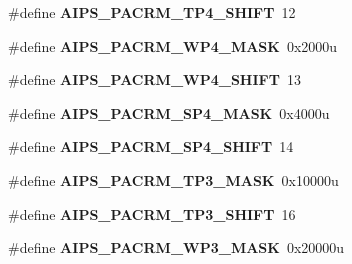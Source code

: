 \begin{DoxyCompactItemize}
\item 
\#define {\bfseries A\+I\+P\+S\+\_\+\+P\+A\+C\+R\+M\+\_\+\+T\+P4\+\_\+\+S\+H\+I\+FT}~12\hypertarget{group__AIPS__Register__Masks_ga5b654374c7c4e22ef97005746f343009}{}\label{group__AIPS__Register__Masks_ga5b654374c7c4e22ef97005746f343009}

\item 
\#define {\bfseries A\+I\+P\+S\+\_\+\+P\+A\+C\+R\+M\+\_\+\+W\+P4\+\_\+\+M\+A\+SK}~0x2000u\hypertarget{group__AIPS__Register__Masks_gacd70ba34033f811730f1ccb84daf0201}{}\label{group__AIPS__Register__Masks_gacd70ba34033f811730f1ccb84daf0201}

\item 
\#define {\bfseries A\+I\+P\+S\+\_\+\+P\+A\+C\+R\+M\+\_\+\+W\+P4\+\_\+\+S\+H\+I\+FT}~13\hypertarget{group__AIPS__Register__Masks_ga3a3e77be99e75550503f7c5b71f3f338}{}\label{group__AIPS__Register__Masks_ga3a3e77be99e75550503f7c5b71f3f338}

\item 
\#define {\bfseries A\+I\+P\+S\+\_\+\+P\+A\+C\+R\+M\+\_\+\+S\+P4\+\_\+\+M\+A\+SK}~0x4000u\hypertarget{group__AIPS__Register__Masks_ga14d029515875232b727e36844ecc8249}{}\label{group__AIPS__Register__Masks_ga14d029515875232b727e36844ecc8249}

\item 
\#define {\bfseries A\+I\+P\+S\+\_\+\+P\+A\+C\+R\+M\+\_\+\+S\+P4\+\_\+\+S\+H\+I\+FT}~14\hypertarget{group__AIPS__Register__Masks_ga9fc76b0cb29d106a835ef7905978be39}{}\label{group__AIPS__Register__Masks_ga9fc76b0cb29d106a835ef7905978be39}

\item 
\#define {\bfseries A\+I\+P\+S\+\_\+\+P\+A\+C\+R\+M\+\_\+\+T\+P3\+\_\+\+M\+A\+SK}~0x10000u\hypertarget{group__AIPS__Register__Masks_ga6d28a3c9779892919330279a33555751}{}\label{group__AIPS__Register__Masks_ga6d28a3c9779892919330279a33555751}

\item 
\#define {\bfseries A\+I\+P\+S\+\_\+\+P\+A\+C\+R\+M\+\_\+\+T\+P3\+\_\+\+S\+H\+I\+FT}~16\hypertarget{group__AIPS__Register__Masks_gabfa8070a81960bcd605ec46272af76dd}{}\label{group__AIPS__Register__Masks_gabfa8070a81960bcd605ec46272af76dd}

\item 
\#define {\bfseries A\+I\+P\+S\+\_\+\+P\+A\+C\+R\+M\+\_\+\+W\+P3\+\_\+\+M\+A\+SK}~0x20000u\hypertarget{group__AIPS__Register__Masks_gae951389caa46549b62841e9432e83f03}{}\label{group__AIPS__Register__Masks_gae951389caa46549b62841e9432e83f03}


\end{DoxyCompactItemize}
